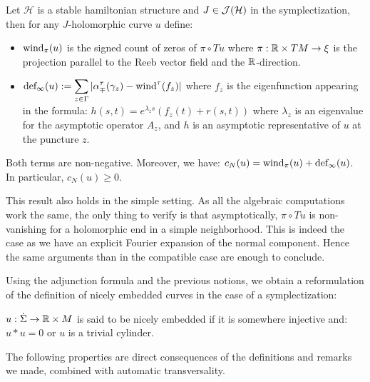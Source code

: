 \documentclass[../main.tex]{subfiles}
\begin{document}
\begin{definition}
Let $\mathcal{H}$ is a stable hamiltonian structure and $J\in\mathcal{J}(\mathcal{H})$ in the symplectization, then for any $J$-holomorphic curve $u$ define:
\begin{itemize}
    \item $\text{wind}_\pi(u)$ is the signed count of zeros of $\pi\circ Tu$ where $\pi : \mathbb{R}\times TM\rightarrow \xi$ is the projection parallel to the Reeb vector field and the $\mathbb{R}$-direction.
    \item $\text{def}_\infty(u) := \displaystyle\sum_{z\in\Gamma}|\alpha_\mp^\tau(\gamma_z) - \text{wind}^\tau(f_z)|$ where $f_z$ is the eigenfunction appearing in the formula: $h(s,t) = e^{\lambda_z s}(f_z(t) + r(s,t))$ where $\lambda_z$ is an eigenvalue for the asymptotic operator $A_z$, and $h$ is an asymptotic representative of $u$ at the puncture $z$.
\end{itemize}
Both terms are non-negative. Moreover, we have: $c_N(u) = \text{wind}_\pi(u) + \text{def}_\infty(u)$. In particular, $c_N(u)\geq 0$.
\end{definition}

\begin{remark}
This result also holds in the simple setting. As all the algebraic computations work the same, the only thing to verify is that asymptotically, $\pi\circ Tu$ is non-vanishing for a holomorphic end in a simple neighborhood. This is indeed the case as we have an explicit Fourier expansion of the normal component. Hence the same arguments than in the compatible case are enough to conclude.
\end{remark}

Using the adjunction formula and the previous notions, we obtain a reformulation of the definition of nicely embedded curves in the case of a symplectization: 
\begin{definition}
$u: \dot\Sigma\rightarrow \mathbb{R}\times M$ is said to be nicely embedded if it is somewhere injective and: $u*u = 0$ or $u$ is a trivial cylinder.
\end{definition}

The following properties are direct consequences of the definitions and remarks we made, combined with automatic transversality.
\end{document}
